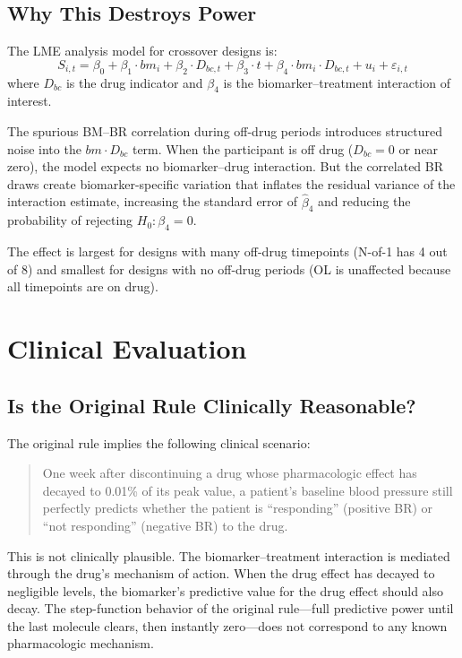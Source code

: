 \documentclass[11pt]{article}
\begin{document}
\subsection{Why This Destroys Power}

The LME analysis model for crossover designs is:
\[
S_{i,t} = \beta_0 + \beta_1 \cdot bm_i +
  \beta_2 \cdot D_{bc,t} + \beta_3 \cdot t +
  \beta_4 \cdot bm_i \cdot D_{bc,t} +
  u_i + \varepsilon_{i,t}
\]
where $D_{bc}$ is the drug indicator and $\beta_4$ is the
biomarker--treatment interaction of interest.

The spurious BM--BR correlation during off-drug periods
introduces structured noise into the $bm \cdot D_{bc}$
term. When the participant is off drug ($D_{bc} = 0$ or
near zero), the model expects no biomarker--drug interaction.
But the correlated BR draws create biomarker-specific variation
that inflates the residual variance of the interaction
estimate, increasing the standard error of $\hat{\beta}_4$
and reducing the probability of rejecting $H_0: \beta_4 = 0$.

The effect is largest for designs with many off-drug timepoints
(N-of-1 has 4 out of 8) and smallest for designs with no
off-drug periods (OL is unaffected because all timepoints are
on drug).

\section{Clinical Evaluation}

\subsection{Is the Original Rule Clinically Reasonable?}

The original rule implies the following clinical scenario:

\begin{quote}
One week after discontinuing a drug whose pharmacologic
effect has decayed to 0.01\% of its peak value, a patient's
baseline blood pressure still perfectly predicts whether the
patient is ``responding'' (positive BR) or ``not responding''
(negative BR) to the drug.
\end{quote}

This is not clinically plausible. The biomarker--treatment
interaction is mediated through the drug's mechanism of action.
When the drug effect has decayed to negligible levels, the
biomarker's predictive value for the drug effect should also
decay. The step-function behavior of the original rule---full
predictive power until the last molecule clears, then
instantly zero---does not correspond to any known pharmacologic
mechanism.
\end{document}
